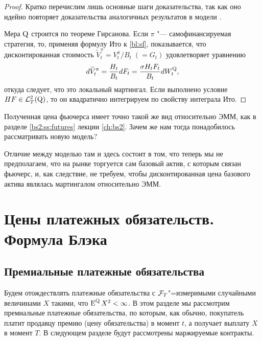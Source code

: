 \begin{proof}
Кратко перечислим лишь основные шаги доказательства, так как оно идейно повторяет доказательства аналогичных результатов в модели \bs.

Мера $\mathrm{Q}$ строится по теореме Гирсанова.
Если $\pi$ "--- самофинансируемая стратегия, то, применяя формулу Ито к \eqref{bl:sf}, показывается, что дисконтированная стоимость $\tilde V_t^\pi = V_t^\pi/B_t\;(=G_t)$ удовлетворяет уравнению
\[
d\widetilde V_t^\pi = \frac{H_t}{B_t} dF_t = \frac{\sigma H_t F_t}{B_t}dW_t^{\mathrm{Q}},
\]
откуда следует, что это локальный мартингал.
Если выполнено условие $HF \in \mathcal{L}^2_T(\mathrm{Q})$, то он квадратично интегрируем по свойству интеграла Ито.
\end{proof}
\begin{remark}
Полученная цена фьючерса имеет точно такой же вид относительно ЭММ, как в разделе \ref{bs2:ss:futures} лекции \ref{ch:bs2}.
Зачем же нам тогда понадобилось рассматривать новую модель?

Отличие между моделью там и здесь состоит в том, что теперь мы не предполагаем, что на рынке торгуется сам базовый актив, с которым связан фьючерс, и, как следствие, не требуем, чтобы дисконтированная цена базового актива являлась мартингалом относительно ЭММ. 
%
\end{remark}


\section{Цены платежных обязательств. Формула Блэка}

\subsection{Премиальные платежные обязательства}
Будем отождествлять платежные обязательства с $\mathcal{F}_T$"=измеримыми случайными величинами $X$ такими, что $\operatorname{E}^{\mathrm{Q}} X^2 < \infty$.
В этом разделе мы рассмотрим премиальные платежные обязательства, по которым, как обычно, покупатель платит продавцу премию (цену обязательства) в момент $t$, а получает выплату $X$ в момент $T$.
В следующем разделе будут рассмотрены маржируемые контракты.

